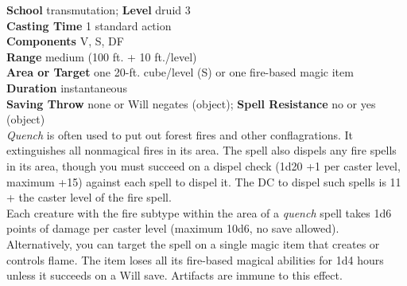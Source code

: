 \textbf{School} transmutation; \textbf{Level} druid 3\\
\textbf{Casting Time} 1 standard action\\
\textbf{Components} V, S, DF\\
\textbf{Range }medium (100 ft. + 10 ft./level)\\
\textbf{Area or Target} one 20-ft. cube/level (S) or one fire-based magic item\\
\textbf{Duration} instantaneous\\
\textbf{Saving Throw} none or Will negates (object); \textbf{Spell Resistance} no or yes (object)\\
\textit{Quench }is often used to put out forest fires and other conflagrations. It extinguishes all nonmagical fires in its area. The spell also dispels any fire spells in its area, though you must succeed on a dispel check (1d20 +1 per caster level, maximum +15) against each spell to dispel it. The DC to dispel such spells is 11 + the caster level of the fire spell.\\
Each creature with the fire subtype within the area of a \textit{quench }spell takes 1d6 points of damage per caster level (maximum 10d6, no save allowed).\\
Alternatively, you can target the spell on a single magic item that creates or controls flame\textit{. }The item loses all its fire-based magical abilities for 1d4 hours unless it succeeds on a Will save. Artifacts are immune to this effect.\\
